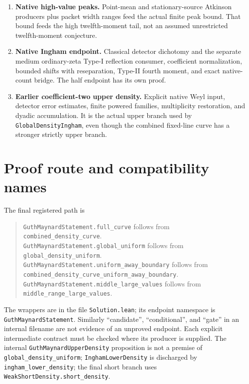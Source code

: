 \documentclass[11pt,a4paper,oneside]{book}
\theoremstyle{definition}
\newcommand{\lean}[1]{\nolinkurl{#1}}
\begin{document}
\begin{enumerate}[leftmargin=*]
assembly. The sharper \lean{ShortMobiusFourthMoment} contract remains
separate and is not used in the unconditional endpoints.
\item \textbf{Native high-value peaks.} Point-mean and stationary-source
Atkinson producers plus packet width ranges feed the actual finite peak
bound. That bound feeds the high twelfth-moment tail, not an assumed
unrestricted twelfth-moment conjecture.
\item \textbf{Native Ingham endpoint.} Classical detector dichotomy and the
separate medium ordinary-zeta Type-I reflection consumer, coefficient
normalization, bounded shifts with reseparation, Type-II fourth moment,
and exact native-count bridge. The half endpoint has its own proof.
\item \textbf{Earlier coefficient-two upper density.} Explicit native Weyl
input, detector error estimates, finite powered families, multiplicity
restoration, and dyadic accumulation. It is the actual upper branch used
by \lean{GlobalDensityIngham}, even though the combined fixed-line curve
has a stronger strictly upper branch.
\end{enumerate}

\section{Proof route and compatibility names}
The final registered path is
\begin{quote}\small
\lean{GuthMaynardStatement.full_curve} follows from
\lean{combined_density_curve}.\\
\lean{GuthMaynardStatement.global_uniform} follows from
\lean{global_density_uniform}.\\
\lean{GuthMaynardStatement.uniform_away_boundary} follows from
\lean{combined_density_curve_uniform_away_boundary}.\\
\lean{GuthMaynardStatement.middle_large_values} follows from
\lean{middle_range_large_values}.
\end{quote}
The wrappers are in the file \lean{Solution.lean}; its endpoint namespace
is \lean{GuthMaynardStatement}. Similarly ``candidate'', ``conditional'', and ``gate'' in
an internal filename are not evidence of an unproved endpoint. Each explicit
intermediate contract must be checked where its producer is supplied.
The internal \lean{GuthMaynardUpperDensity} proposition is not a premise of
\lean{global_density_uniform}; \lean{InghamLowerDensity} is discharged by
\lean{ingham_lower_density}; the final short branch uses
\lean{WeakShortDensity.short_density}.
\end{document}
